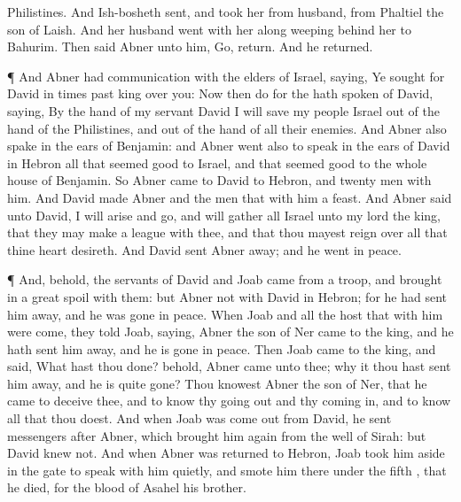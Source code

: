 {Philistines.
And
Ish-bosheth
sent, and
took her from
{}
husband,
{} from
Phaltiel the
son of
Laish.
And her
husband
went with her along
weeping
behind her to
Bahurim. Then
said
Abner unto him,
Go,
return. And he
returned.
\par }{\PP {}¶ And
Abner had
communication with the
elders of
Israel,
saying, Ye
sought for
David in
times
past
{}
king over you:
Now then
do
{} for the
{} hath
spoken of
David,
saying, By the
hand of my
servant
David I will
save my
people
Israel out of the
hand of the
Philistines, and out of the
hand of all their
enemies.
And
Abner also
spake in the
ears of
Benjamin: and
Abner
went also to
speak in the
ears of
David in
Hebron all that
seemed
good to
Israel, and that seemed
good to the whole
house of
Benjamin.
So
Abner
came to
David to
Hebron, and
twenty
men with him. And
David
made
Abner and the
men that
{} with him a
feast.
And
Abner
said unto
David, I will
arise and
go, and will
gather all
Israel unto my
lord the
king, that they may
make a
league with thee, and that thou mayest
reign over all that thine
heart
desireth. And
David
sent
Abner
away; and he
went in
peace.
\par }{\PP {}¶ And, behold, the
servants of
David and
Joab
came from
{} a
troop, and brought
in a
great
spoil with them: but
Abner
{} not with
David in
Hebron; for he had sent him
away, and he was
gone in
peace.
When
Joab and all the
host that
{} with him were
come, they
told
Joab,
saying,
Abner the
son of
Ner
came to the
king, and he hath sent him
away, and he is
gone in
peace.
Then
Joab
came to the
king, and
said, What hast thou
done? behold,
Abner
came unto thee; why
{} it
{} thou hast sent him
away, and he is
quite
gone?
Thou
knowest
Abner the
son of
Ner, that he
came to
deceive thee, and to
know thy going
out and thy coming
in, and to
know all that thou
doest.
And when
Joab was come
out from
David, he
sent
messengers
after
Abner, which brought him
again from the
well of
Sirah: but
David
knew
{} not.
And when
Abner was
returned to
Hebron,
Joab took him
aside
in the
gate to
speak with him
quietly, and
smote him there under the
fifth
{}, that he
died, for the
blood of
Asahel his
brother.
}

